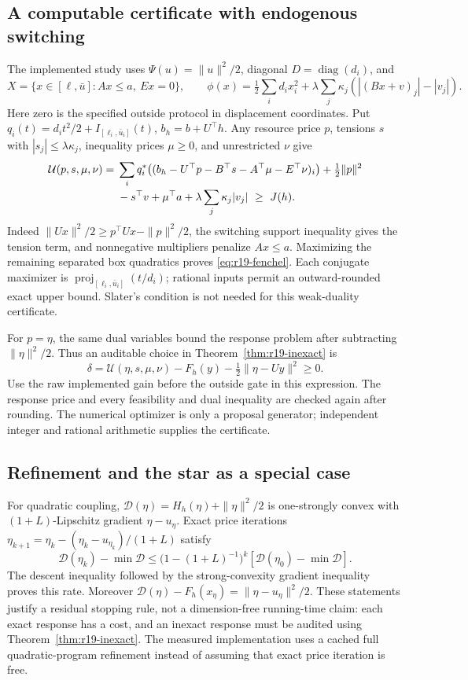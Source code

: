 \documentclass[11pt,letterpaper]{article}
\theoremstyle{definition}
\newcommand{\1}{\mathbf 1}
\begin{document}
\subsection{A computable certificate with endogenous switching}
The implemented study uses $\Psi(u)=\|u\|^2/2$, diagonal $D=\operatorname{diag}(d_i)$, and
\[
 X=\{x\in[\ell,\bar u]:Ax\leq a,\ Ex=0\},\qquad
 \phi(x)=\tfrac12\sum_i d_ix_i^2+
 \lambda\sum_j\kappa_j(|(Bx+v)_j|-|v_j|).
\]
Here zero is the specified outside protocol in displacement coordinates. Put $q_i(t)=d_it^2/2+I_{[\ell_i,\bar u_i]}(t)$, $b_h=b+U^\top h$. Any resource price $p$, tensions $s$ with $|s_j|\leq\lambda\kappa_j$, inequality prices $\mu\geq0$, and unrestricted $\nu$ give
\begin{align}
 \mathcal U(p,s,\mu,\nu)={}&
 \sum_i q_i^*\big((b_h-U^\top p-B^\top s-A^\top\mu-E^\top\nu)_i\big)
 +\tfrac12\|p\|^2\notag\\[-2pt]
 &-s^\top v+\mu^\top a+\lambda\sum_j\kappa_j|v_j|\ \geq\ J(h).
 \label{eq:r19-fenchel}
\end{align}
Indeed $\|Ux\|^2/2\geq p^\top Ux-\|p\|^2/2$, the switching support inequality gives the tension term, and nonnegative multipliers penalize $Ax\leq a$. Maximizing the remaining separated box quadratics proves \eqref{eq:r19-fenchel}. Each conjugate maximizer is $\operatorname{proj}_{[\ell_i,\bar u_i]}(t/d_i)$; rational inputs permit an outward-rounded exact upper bound. Slater's condition is not needed for this weak-duality certificate.

For $p=\eta$, the same dual variables bound the response problem after subtracting $\|\eta\|^2/2$. Thus an auditable choice in Theorem~\ref{thm:r19-inexact} is
\begin{equation}\label{eq:r19-deltacompute}
 \delta=\mathcal U(\eta,s,\mu,\nu)-F_h(y)
                  -\tfrac12\|\eta-Uy\|^2\geq0.
\end{equation}
Use the raw implemented gain before the outside gate in this expression. The response price and every feasibility and dual inequality are checked again after rounding. The numerical optimizer is only a proposal generator; independent integer and rational arithmetic supplies the certificate.

\subsection{Refinement and the star as a special case}
For quadratic coupling, $\mathcal D(\eta)=H_h(\eta)+\|\eta\|^2/2$ is one-strongly convex with $(1+L)$-Lipschitz gradient $\eta-u_\eta$. Exact price iterations
$\eta_{k+1}=\eta_k-(\eta_k-u_{\eta_k})/(1+L)$ satisfy
\[
 \mathcal D(\eta_k)-\min\mathcal D
 \leq\bigl(1-(1+L)^{-1}\bigr)^k
        [\mathcal D(\eta_0)-\min\mathcal D].
\]
The descent inequality followed by the strong-convexity gradient inequality proves this rate. Moreover $\mathcal D(\eta)-F_h(x_\eta)=\|\eta-u_\eta\|^2/2$. These statements justify a residual stopping rule, not a dimension-free running-time claim: each exact response has a cost, and an inexact response must be audited using Theorem~\ref{thm:r19-inexact}. The measured implementation uses a cached full quadratic-program refinement instead of assuming that exact price iteration is free.
\end{document}
